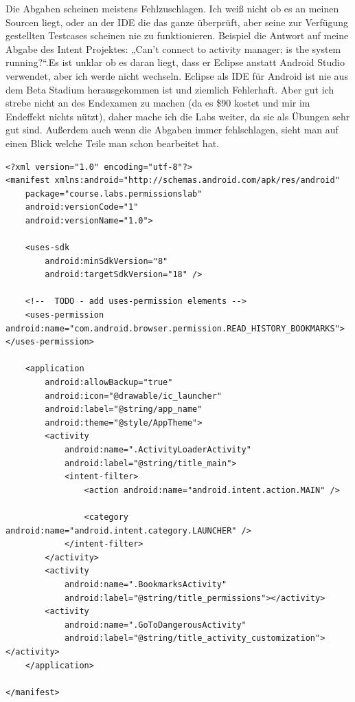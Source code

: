 \documentclass[12pt,a4paper,bibliography=totocnumbered,listof=totocnumbered]{scrartcl}
\begin{document}
Die Abgaben scheinen meistens Fehlzuschlagen. Ich weiß nicht ob es an meinen Sourcen liegt, oder an der IDE die das ganze überprüft, aber seine zur Verfügung gestellten Testcases scheinen nie zu funktionieren. Beispiel die Antwort auf meine Abgabe des Intent Projektes: „Can't connect to activity manager; is the system running?“.Es ist unklar ob es daran liegt, dass er Eclipse anstatt Android Studio verwendet, aber ich werde nicht wechseln. Eclipse als IDE für Android ist nie aus dem Beta Stadium herausgekommen ist und ziemlich Fehlerhaft. Aber gut ich strebe nicht an des Endexamen zu machen (da es \$90 kostet und mir im Endeffekt nichts nützt), daher mache ich die Labs weiter, da sie als Übungen sehr gut sind. Außerdem auch wenn die Abgaben immer fehlschlagen, sieht man auf einen Blick welche Teile man schon bearbeitet hat. 

\vspace{1em}
\begin{lstlisting}[caption=Android Mainfest mit TODO der Lab, label=lst:Android Manifest]
<?xml version="1.0" encoding="utf-8"?>
<manifest xmlns:android="http://schemas.android.com/apk/res/android"
    package="course.labs.permissionslab"
    android:versionCode="1"
    android:versionName="1.0">

    <uses-sdk
        android:minSdkVersion="8"
        android:targetSdkVersion="18" />

    <!--  TODO - add uses-permission elements -->
    <uses-permission android:name="com.android.browser.permission.READ_HISTORY_BOOKMARKS"></uses-permission>

    <application
        android:allowBackup="true"
        android:icon="@drawable/ic_launcher"
        android:label="@string/app_name"
        android:theme="@style/AppTheme">
        <activity
            android:name=".ActivityLoaderActivity"
            android:label="@string/title_main">
            <intent-filter>
                <action android:name="android.intent.action.MAIN" />

                <category android:name="android.intent.category.LAUNCHER" />
            </intent-filter>
        </activity>
        <activity
            android:name=".BookmarksActivity"
            android:label="@string/title_permissions"></activity>
        <activity
            android:name=".GoToDangerousActivity"
            android:label="@string/title_activity_customization"></activity>
    </application>

</manifest>
\end{lstlisting}
\end{document}
